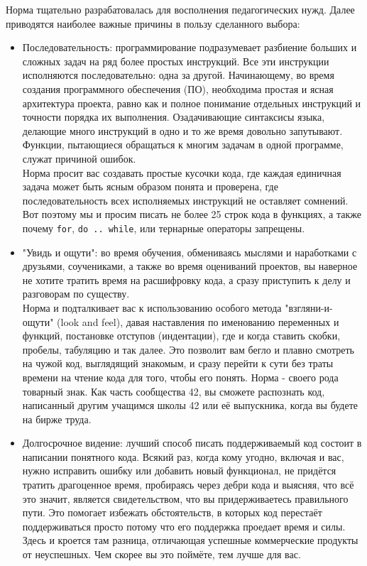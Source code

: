 \documentclass{42-ru}
\begin{document}
    Норма тщательно разрабатовалась для восполнения педагогических нужд.
    Далее приводятся наиболее важные причины в пользу сделанного выбора:
    \begin{itemize}

        \item Последовательность: программирование подразумевает разбиение больших и сложных задач
            на ряд более простых инструкций. Все эти инструкции исполняются последовательно:
            одна за другой. Начинающему, во время создания программного обеспечения (ПО), необходима
            простая и ясная архитектура проекта, равно как и полное понимание отдельных инструкций и
            точности порядка их выполнения. Озадачивающие синтаксисы языка, делающие много инструкций
            в одно и то же время довольно запутывают. Функции, пытающиеся обращаться к многим задачам в одной программе, служат причиной ошибок.\\
            Норма просит вас создавать простые кусочки кода, где каждая единичная задача может быть
            ясным образом понята и проверена, где последовательность всех исполняемых инструкций
            не оставляет сомнений. Вот поэтому мы и просим писать не более 25 строк кода в функциях,
            а также почему \texttt{for}, \texttt{do .. while}, или тернарные операторы запрещены.

        \item "Увидь и ощути": во время обучения, обмениваясь мыслями и наработками с друзьями,
            соучениками, а также во время оцениваний проектов, вы наверное не хотите тратить время
            на расшифровку кода, а сразу приступить к делу и разговорам по существу.\\
            Норма и подталкивает вас к использованию особого метода "взгляни-и-ощути" (look and feel),
            давая наставления по именованию переменных и функций, постановке отступов (индентации),
            где и когда ставить скобки, пробелы, табуляцию и так далее.
            Это позволит вам бегло и плавно смотреть на чужой код, выглядящий знакомым, и сразу перейти
            к сути без траты времени на чтение кода для того, чтобы его понять.
            Норма - своего рода товарный знак. Как часть сообщества 42, вы сможете распознать код,
            написанный другим учащимся школы 42 или её выпускника, когда вы будете на бирже труда.
    
        \item Долгосрочное видение: лучший способ писать поддерживаемый код состоит в написании понятного кода.
            Всякий раз, когда кому угодно, включая и вас, нужно исправить ошибку или добавить новый функционал,
            не придётся тратить драгоценное время, пробираясь через дебри кода и выясняя, что всё это значит,
            является свидетельством, что вы придерживаетесь правильного пути. Это помогает избежать обстоятельств,
            в которых код перестаёт поддерживаться просто потому что его поддержка проедает время и силы.
            Здесь и кроется там разница, отличающая успешные коммерческие продукты от неуспешных.
            Чем скорее вы это поймёте, тем лучше для вас.


\end{itemize}
\end{document}
